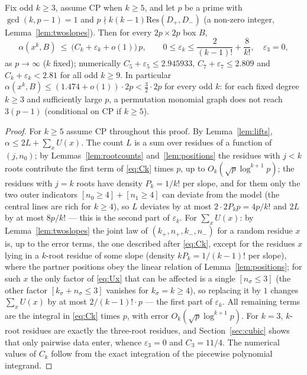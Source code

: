 \begin{theorem}\label{thm:perm}
Fix odd $k\ge3$, assume CP when $k\ge5$, and let $p$ be a prime with $\gcd(k,p-1)=1$ and $p\nmid k(k-1)\mathrm{Res}(D_+,D_-)$ (a non-zero integer, Lemma~\ref{lem:twoslopes}).
Then for every $2p\times2p$ box $B$,
\[
 \alpha(x^k,B)\ \le\ \bigl(C_k+\varepsilon_k+o(1)\bigr)\,p,\qquad 0\le\varepsilon_k\le\frac2{(k-1)!}+\frac8{k!},\quad \varepsilon_3=0,
\]
as $p\to\infty$ ($k$ fixed); numerically $C_5+\varepsilon_5\le2.945933$, $C_7+\varepsilon_7\le2.809$ and $C_k+\varepsilon_k<2.81$ for all odd $k\ge9$.  In particular
$\alpha(x^k,B)\le(1.474+o(1))\cdot2p<\tfrac32\cdot2p$ for every odd $k$: for each fixed degree $k\ge3$ and sufficiently large $p$, a permutation monomial graph does not reach $3(p-1)$ (conditional on CP if $k\ge5$).
\end{theorem}
\begin{proof}
For $k\ge5$ assume CP throughout this proof.  By Lemma~\ref{lem:lifts}, $\alpha\le2L+\sum_xU(x)$.  The count $L$ is a sum over residues of a function of $(j,n_0)$; by Lemmas~\ref{lem:rootcounts}
and~\ref{lem:positions} the residues with $j<k$ roots contribute the first term of \eqref{eq:Ck} times $p$, up to $O_k(\sqrt p\log^{k+1}p)$; the residues
with $j=k$ roots have density $P_k=1/k!$ per slope, and for them only the two outer indicators $[n_0\ge4]+[n_1\ge4]$ can deviate from the model
(the central lines are rich for $k\ge4$), so $L$ deviates by at most $2\cdot2P_kp=4p/k!$ and $2L$ by at most $8p/k!$ — this is the second part of
$\varepsilon_k$.  For $\sum_xU(x)$: by Lemma~\ref{lem:twoslopes} the joint law of $(k_+,n_+,k_-,n_-)$ for a random residue $x$ is, up to the error terms, the
one described after \eqref{eq:Ck}, except for the residues $x$ lying in a $k$-root residue of some slope (density $kP_k=1/(k-1)!$ per slope), where the
partner positions obey the linear relation of Lemma~\ref{lem:positions}; for such $x$ the only factor of \eqref{eq:Ux} that can be affected is a single
$[n_\sigma\le3]$ (the other factor $[k_\sigma+n_\sigma\le3]$ vanishes for $k_\sigma=k\ge4$), so replacing it by $1$ changes $\sum_xU(x)$ by at most
$2/(k-1)!\cdot p$ — the first part of $\varepsilon_k$.  All remaining terms are the integral in \eqref{eq:Ck} times $p$, with error $O_k(\sqrt p\log^{k+1}p)$.
For $k=3$, $k$-root residues are exactly the three-root residues, and Section~\ref{sec:cubic} shows that only pairwise data enter, whence $\varepsilon_3=0$
and $C_3=11/4$.  The numerical values of $C_k$ follow from the exact integration of the piecewise polynomial integrand.
\end{proof}

